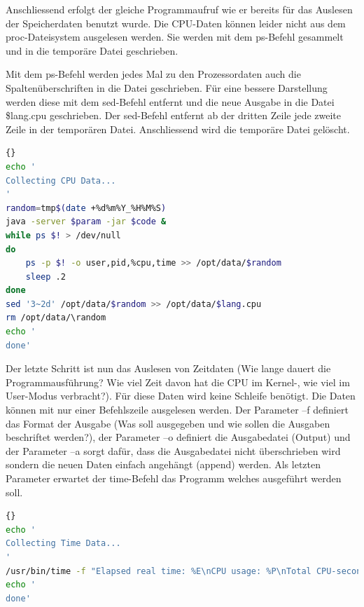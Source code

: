 \documentclass{fancydocument}
\begin{document}
Anschliessend erfolgt der gleiche Programmaufruf wie er bereits für das Auslesen der Speicherdaten benutzt wurde. Die CPU-Daten können leider nicht aus dem proc-Dateisystem ausgelesen werden. Sie werden mit dem ps-Befehl gesammelt und in die temporäre Datei geschrieben.

Mit dem ps-Befehl werden jedes Mal zu den Prozessordaten auch die Spaltenüberschriften in die Datei geschrieben. Für eine bessere Darstellung werden diese mit dem sed-Befehl entfernt und die neue Ausgabe in die Datei \$lang.cpu geschrieben. Der sed-Befehl entfernt ab der dritten Zeile jede zweite Zeile in der temporären Datei. Anschliessend wird die temporäre Datei gelöscht.

\noindent
\begin{minipage}{\textwidth}
\begin{lstlisting}[language=bash,caption=CPU-Daten sammeln]{}
echo '
Collecting CPU Data...
'
random=tmp$(date +%d%m%Y_%H%M%S)
java -server $param -jar $code &	
while ps $! > /dev/null
do
	ps -p $! -o user,pid,%cpu,time >> /opt/data/$random
	sleep .2
done
sed '3~2d' /opt/data/$random >> /opt/data/$lang.cpu
rm /opt/data/\random
echo '
done'
\end{lstlisting}
\end{minipage}

Der letzte Schritt ist nun das Auslesen von Zeitdaten (Wie lange dauert die Programmausführung? Wie viel Zeit davon hat die CPU im Kernel-, wie viel im User-Modus verbracht?). Für diese Daten wird keine Schleife benötigt. Die Daten können mit nur einer Befehlszeile ausgelesen werden. Der Parameter –f definiert das Format der Ausgabe (Was soll ausgegeben und wie sollen die Ausgaben beschriftet werden?), der Parameter –o definiert die Ausgabedatei (Output) und der Parameter –a sorgt dafür, dass die Ausgabedatei nicht überschrieben wird sondern die neuen Daten einfach angehängt (append) werden. Als letzten Parameter erwartet der time-Befehl das Programm welches ausgeführt werden soll.

\noindent
\begin{minipage}{\textwidth}
\begin{lstlisting}[language=bash,caption=Zeitdaten sammeln]{}
echo '
Collecting Time Data...
'
/usr/bin/time -f "Elapsed real time: %E\nCPU usage: %P\nTotal CPU-seconds in user mode: %U\nTotal CPU-seconds in kernel mode: %S\nName and arguments of the command: %C" -o /opt/data/$lang.time -a java -server $param -jar $code
echo '
done'
\end{lstlisting}
\end{minipage}
\end{document}
